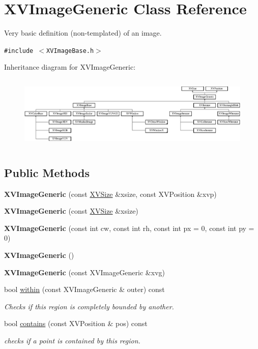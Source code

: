 \hypertarget{class_XVImageGeneric}{
\section{XVImage\-Generic  Class Reference}
\label{XVImageGeneric}
}
Very basic definition (non-templated) of an image. 


{\tt \#include $<$XVImage\-Base.h$>$}

Inheritance diagram for XVImage\-Generic:\begin{figure}[H]
\begin{center}
\leavevmode
\includegraphics[height=3.57013cm]{class_XVImageGeneric}
\end{center}
\end{figure}
\subsection*{Public Methods}
\begin{CompactItemize}
\item 
{\bf XVImage\-Generic} (const \hyperlink{class_XVSize}{XVSize} \&xsize, const XVPosition \&xvp)
\item 
{\bf XVImage\-Generic} (const \hyperlink{class_XVSize}{XVSize} \&xsize)
\item 
{\bf XVImage\-Generic} (const int cw, const int rh, const int px = 0, const int py = 0)
\item 
{\bf XVImage\-Generic} ()
\item 
{\bf XVImage\-Generic} (const XVImage\-Generic \&xvg)
\item 
bool \hyperlink{class_XVImageGeneric_a5}{within} (const XVImage\-Generic \& outer) const
\begin{CompactList}\small\item\em Checks if this region is completely bounded by another.\item\end{CompactList}\item 
bool \hyperlink{class_XVImageGeneric_a6}{contains} (const XVPosition \& pos) const
\begin{CompactList}\small\item\em checks if a point is contained by this region.\item\end{CompactList}\end{CompactItemize}


